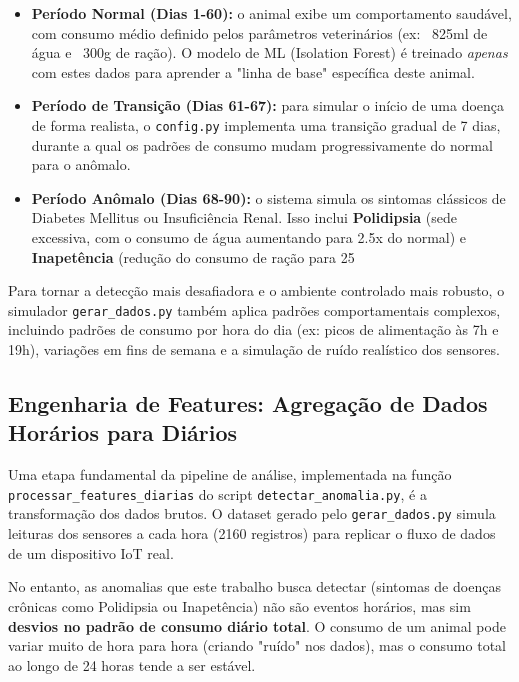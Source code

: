 \begin{itemize}
    \item \textbf{Período Normal (Dias 1-60):} o animal exibe um comportamento saudável, com consumo médio definido pelos parâmetros veterinários (ex: ~825ml de água e ~300g de ração). O modelo de ML (Isolation Forest) é treinado \textit{apenas} com estes dados para aprender a "linha de base" específica deste animal.
    
    \item \textbf{Período de Transição (Dias 61-67):} para simular o início de uma doença de forma realista, o \texttt{config.py} implementa uma transição gradual de 7 dias, durante a qual os padrões de consumo mudam progressivamente do normal para o anômalo.
    
    \item \textbf{Período Anômalo (Dias 68-90):} o sistema simula os sintomas clássicos de Diabetes Mellitus ou Insuficiência Renal. Isso inclui \textbf{Polidipsia} (sede excessiva, com o consumo de água aumentando para 2.5x do normal) e \textbf{Inapetência} (redução do consumo de ração para 25%
\end{itemize}

Para tornar a detecção mais desafiadora e o ambiente controlado mais robusto, o simulador \texttt{gerar\_dados.py} também aplica padrões comportamentais complexos, incluindo padrões de consumo por hora do dia (ex: picos de alimentação às 7h e 19h), variações em fins de semana e a simulação de ruído realístico dos sensores.
\subsection{Engenharia de Features: Agregação de Dados Horários para Diários}

Uma etapa fundamental da pipeline de análise, implementada na função \texttt{processar\_features\_diarias} do script \texttt{detectar\_anomalia.py}, é a transformação dos dados brutos. O dataset gerado pelo \texttt{gerar\_dados.py} simula leituras dos sensores a cada hora (2160 registros) para replicar o fluxo de dados de um dispositivo IoT real.

No entanto, as anomalias que este trabalho busca detectar (sintomas de doenças crônicas como Polidipsia ou Inapetência) não são eventos horários, mas sim \textbf{desvios no padrão de consumo diário total}. O consumo de um animal pode variar muito de hora para hora (criando "ruído" nos dados), mas o consumo total ao longo de 24 horas tende a ser estável.

